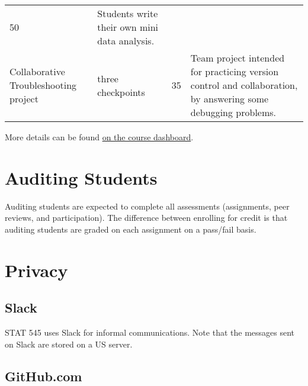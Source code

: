 \documentclass[
]{article}
\begin{document}
\begin{longtable}[]{@{}llll@{}}
\begin{minipage}[t]{0.19\columnwidth}
50\strut
\end{minipage} & \begin{minipage}[t]{0.16\columnwidth}\raggedright
Students write their own mini data analysis.\strut
\end{minipage}\tabularnewline
\begin{minipage}[t]{0.25\columnwidth}\raggedright
Collaborative Troubleshooting project\strut
\end{minipage} & \begin{minipage}[t]{0.28\columnwidth}\raggedright
three checkpoints\strut
\end{minipage} & \begin{minipage}[t]{0.19\columnwidth}\raggedright
35\strut
\end{minipage} & \begin{minipage}[t]{0.16\columnwidth}\raggedright
Team project intended for practicing version control and collaboration,
by answering some debugging problems.\strut
\end{minipage}\tabularnewline
\bottomrule
\end{longtable}

More details can be found \href{https://stat545.stat.ubc.ca/course}{on
the course dashboard}.

\hypertarget{auditing-students}{%
\section{Auditing Students}\label{auditing-students}}

Auditing students are expected to complete all assessments (assignments,
peer reviews, and participation). The difference between enrolling for
credit is that auditing students are graded on each assignment on a
pass/fail basis.

\hypertarget{privacy}{%
\section{Privacy}\label{privacy}}

\hypertarget{slack}{%
\subsection{Slack}\label{slack}}

STAT 545 uses Slack for informal communications. Note that the messages
sent on Slack are stored on a US server.

\hypertarget{github.com}{%
\subsection{GitHub.com}\label{github.com}}
\end{document}
